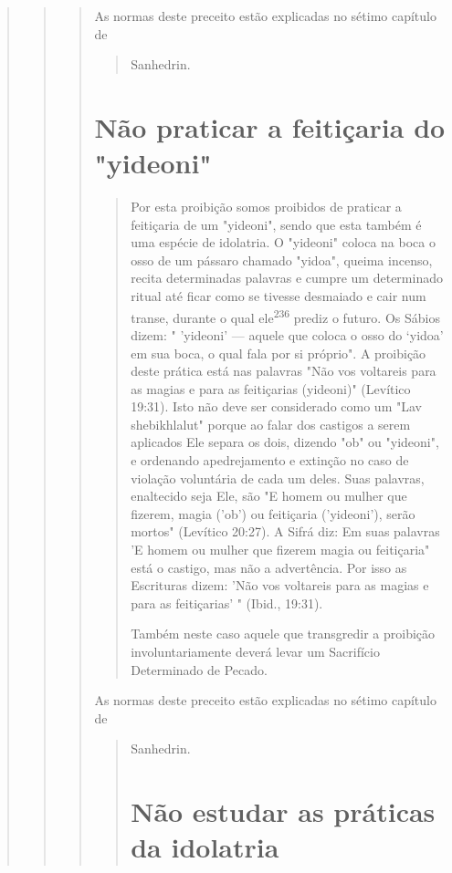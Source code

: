 \begin{quote}
\begin{quote}
\begin{quote}
As normas deste preceito estão explicadas no sétimo capítulo de

\begin{quote}
Sanhedrin.
\end{quote}

\section{Não praticar a feitiçaria do "yideoni"}

\begin{quote}
Por esta proibição somos proibidos de praticar a feitiçaria de um
"yi­deoni", sendo que esta também é uma espécie de idolatria. O
"yideoni" colo­ca na boca o osso de um pássaro chamado "yidoa", queima
incenso, recita de­terminadas palavras e cumpre um determinado ritual
até ficar como se tivesse desmaiado e cair num transe, durante o qual
ele\textsuperscript{236} prediz o futuro. Os Sábios dizem: " 'yideoni'
--- aquele que coloca o osso do `yidoa' em sua boca, o qual fala por si
próprio". A proibição deste prática está nas palavras "Não vos
volta­reis para as magias e para as feitiçarias (yideoni)" (Levítico
19:31). Isto não deve ser considerado como um "Lav shebikhlalut" porque
ao falar dos castigos a serem aplicados Ele separa os dois, dizendo "ob"
ou "yideoni", e ordenando apedrejamento e extinção no caso de violação
voluntária de cada um deles. Suas palavras, enaltecido seja Ele, são "E
homem ou mulher que fizerem, magia ('ob') ou feitiçaria ('yideoni'),
serão mortos" (Levítico 20:27). A Sifrá diz: Em suas pa­lavras 'E homem
ou mulher que fizerem magia ou feitiçaria" está o castigo, mas não a
advertência. Por isso as Escrituras dizem: 'Não vos voltareis para as
ma­gias e para as feitiçarias' " (Ibid., 19:31).

Também neste caso aquele que transgredir a proibição involuntaria­mente
deverá levar um Sacrifício Determinado de Pecado.
\end{quote}

As normas deste preceito estão explicadas no sétimo capítulo de

\begin{quote}
Sanhedrin.

\section{Não estudar as práticas da idolatria}


\end{quote}
\end{quote}
\end{quote}
\end{quote}
